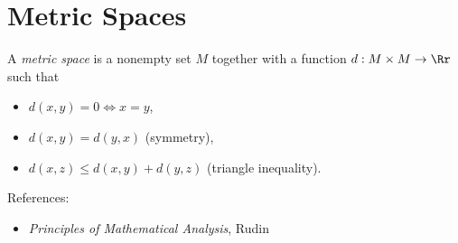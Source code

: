 \chapter{Metric Spaces}
\begin{defn}
  A \emph{metric space} is a nonempty set $M$ together with a function
  $d:M\times M\to\Rr$ such that
  \begin{itemize}
    \item $d(x,y)=0\iff x=y$,
    \item $d(x,y)=d(y,x)$ (symmetry), 
    \item $d(x,z)\le d(x,y)+d(y,z)$ (triangle inequality).
  \end{itemize}
\end{defn}
References:
\begin{itemize}
  \item \emph{Principles of Mathematical Analysis}, Rudin
\end{itemize}
